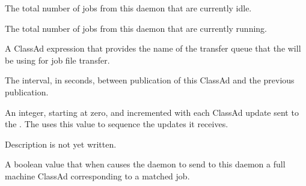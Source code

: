 \begin{description}
\item[\AdAttr{TotalSchedulerIdleJobs}:] The total number of 
    jobs from this
   daemon that are currently idle.

\item[\AdAttr{TotalSchedulerRunningJobs}:] The total number of 
    jobs from this
   daemon that are currently running.

\item[\AdAttr{TransferQueueUserExpr}]
  A ClassAd expression that provides the name of the transfer queue
  that the  will be using for job file transfer.

\item[\AdAttr{UpdateInterval}:] The interval, in seconds,
  between publication of this  ClassAd and
  the previous publication.

\item[\AdAttr{UpdateSequenceNumber}:] An integer, starting at zero,
  and incremented with each ClassAd update sent to the .
  The  uses this value to sequence the updates it
  receives.

\item[\AdAttr{VirtualMemory}:] Description is not yet written.

\item[\AdAttr{WantResAd}:] A boolean value that when 
  causes the  daemon to send to this 
  daemon a full machine ClassAd corresponding to a matched job.

\end{description}

